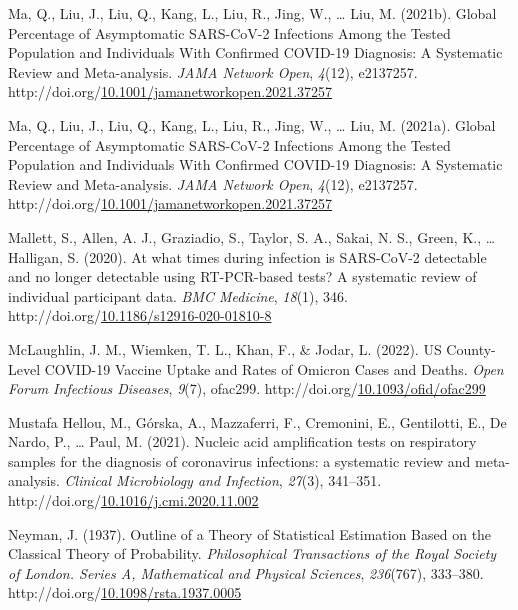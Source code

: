 \documentclass[12pt,twoside]{smiththesis}
\newlength{\cslhangindent}
\newenvironment{CSLReferences}[2] %
 {%
\setlength{\parindent}{0pt}
\ifodd #1 \everypar{\setlength{\hangindent}{\cslhangindent}}\ignorespaces\fi
\ifnum #2 > 0
\setlength{\parskip}{#2\baselineskip}
  \fi
}%
{}
\begin{document}
\begin{CSLReferences}{1}{0}
\leavevmode{}%
Ma, Q., Liu, J., Liu, Q., Kang, L., Liu, R., Jing, W., \ldots{} Liu, M. (2021b). Global Percentage of Asymptomatic SARS-CoV-2 Infections Among the Tested Population and Individuals With Confirmed COVID-19 Diagnosis: A Systematic Review and Meta-analysis. \emph{JAMA Network Open}, \emph{4}(12), e2137257. http://doi.org/\href{https://doi.org/10.1001/jamanetworkopen.2021.37257}{10.1001/jamanetworkopen.2021.37257}

\leavevmode{}%
Ma, Q., Liu, J., Liu, Q., Kang, L., Liu, R., Jing, W., \ldots{} Liu, M. (2021a). Global Percentage of Asymptomatic SARS-CoV-2 Infections Among the Tested Population and Individuals With Confirmed COVID-19 Diagnosis: A Systematic Review and Meta-analysis. \emph{JAMA Network Open}, \emph{4}(12), e2137257. http://doi.org/\href{https://doi.org/10.1001/jamanetworkopen.2021.37257}{10.1001/jamanetworkopen.2021.37257}

\leavevmode{}%
Mallett, S., Allen, A. J., Graziadio, S., Taylor, S. A., Sakai, N. S., Green, K., \ldots{} Halligan, S. (2020). At what times during infection is SARS-CoV-2 detectable and no longer detectable using RT-PCR-based tests? A systematic review of individual participant data. \emph{BMC Medicine}, \emph{18}(1), 346. http://doi.org/\href{https://doi.org/10.1186/s12916-020-01810-8}{10.1186/s12916-020-01810-8}

\leavevmode{}%
McLaughlin, J. M., Wiemken, T. L., Khan, F., \& Jodar, L. (2022). US County-Level COVID-19 Vaccine Uptake and Rates of Omicron Cases and Deaths. \emph{Open Forum Infectious Diseases}, \emph{9}(7), ofac299. http://doi.org/\href{https://doi.org/10.1093/ofid/ofac299}{10.1093/ofid/ofac299}

\leavevmode{}%
Mustafa Hellou, M., Górska, A., Mazzaferri, F., Cremonini, E., Gentilotti, E., De Nardo, P., \ldots{} Paul, M. (2021). Nucleic acid amplification tests on respiratory samples for the diagnosis of coronavirus infections: a systematic review and meta-analysis. \emph{Clinical Microbiology and Infection}, \emph{27}(3), 341--351. http://doi.org/\href{https://doi.org/10.1016/j.cmi.2020.11.002}{10.1016/j.cmi.2020.11.002}

\leavevmode{}%
Neyman, J. (1937). Outline of a Theory of Statistical Estimation Based on the Classical Theory of Probability. \emph{Philosophical Transactions of the Royal Society of London. Series A, Mathematical and Physical Sciences}, \emph{236}(767), 333--380. http://doi.org/\href{https://doi.org/10.1098/rsta.1937.0005}{10.1098/rsta.1937.0005}


\end{CSLReferences}
\end{document}
